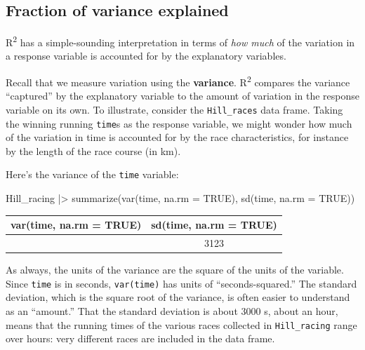 \documentclass[
  letterpaper,
  DIV=11,
  numbers=noendperiod,
  oneside]{scrartcl}
\newenvironment{Shaded}{\begin{snugshade}}{\end{snugshade}}
\newcommand{\AttributeTok}[1]{\textcolor[rgb]{0.40,0.45,0.13}{#1}}
\newcommand{\ConstantTok}[1]{\textcolor[rgb]{0.56,0.35,0.01}{#1}}
\newcommand{\FunctionTok}[1]{\textcolor[rgb]{0.28,0.35,0.67}{#1}}
\newcommand{\NormalTok}[1]{\textcolor[rgb]{0.00,0.23,0.31}{#1}}
\newcommand{\SpecialCharTok}[1]{\textcolor[rgb]{0.37,0.37,0.37}{#1}}
\begin{document}
\subsection{Fraction of variance
explained}\label{fraction-of-variance-explained}

R\textsuperscript{2} has a simple-sounding interpretation in terms of
\emph{how much} of the variation in a response variable is accounted for
by the explanatory variables.

Recall that we measure variation using the \textbf{variance}.
R\textsuperscript{2} compares the variance ``captured'' by the
explanatory variable to the amount of variation in the response variable
on its own. To illustrate, consider the \texttt{Hill\_races} data frame.
Taking the winning running \texttt{time}s as the response variable, we
might wonder how much of the variation in time is accounted for by the
race characteristics, for instance by the length of the race course (in
km).

Here's the variance of the \texttt{time} variable:

\begin{Shaded}
\begin{Highlighting}[]
\NormalTok{Hill\_racing }\SpecialCharTok{|\textgreater{}} \FunctionTok{summarize}\NormalTok{(}\FunctionTok{var}\NormalTok{(time, }\AttributeTok{na.rm =} \ConstantTok{TRUE}\NormalTok{), }\FunctionTok{sd}\NormalTok{(time, }\AttributeTok{na.rm =} \ConstantTok{TRUE}\NormalTok{))}
\end{Highlighting}
\end{Shaded}

\begin{longtable}[]{@{}cc@{}}
\toprule\noalign{}
var(time, na.rm = TRUE) & sd(time, na.rm = TRUE) \\
\midrule\noalign{}
\endhead
\bottomrule\noalign{}
\endlastfoot
9754276 & 3123 \\
\end{longtable}

As always, the units of the variance are the square of the units of the
variable. Since \texttt{time} is in seconds, \texttt{var(time)} has
units of ``seconds-squared.'' The standard deviation, which is the
square root of the variance, is often easier to understand as an
``amount.'' That the standard deviation is about 3000 s, about an hour,
means that the running times of the various races collected in
\texttt{Hill\_racing} range over hours: very different races are
included in the data frame.
\end{document}
